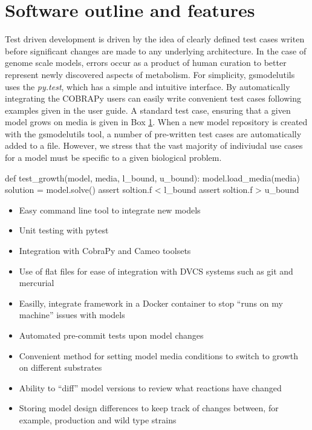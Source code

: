 \documentclass{bioinfo}
\begin{document}

\section{Software outline and features}
Test driven development is driven by the idea of clearly defined test cases writen before significant changes are made to any underlying architecture.
In the case of genome scale models, errors occur as a product of human curation to better represent newly discovered aspects of metabolism.
For simplicity, gsmodelutils uses the \textit{py.test}, which has a simple and intuitive interface.
By automatically integrating the COBRAPy \cite{} users can easily write convenient test cases following examples given in the user guide.
A standard test case, ensuring that a given model grows on media is given in Box \ref{}.
When a new model repository is created with the gsmodelutils tool, a number of pre-written test cases are automatically added to a file.
However, we stress that the vast majority of indiviudal use cases for a model must be specific to a given biological problem.

\begin{verbatim*}
def test_growth(model, media, l_bound, u_bound):
    model.load_media(media)
    solution = model.solve()
    assert soltion.f < l_bound
    assert soltion.f > u_bound
\end{verbatim*}


\begin{itemize}
 \item Easy command line tool to integrate new models
 \item Unit testing with pytest
 \item Integration with CobraPy and Cameo toolsets
 \item Use of flat files for ease of integration with DVCS systems such as git and mercurial
 \item Easilly, integrate framework in a Docker container to stop ``runs on my machine'' issues with models
 \item Automated pre-commit tests upon model changes
 \item Convenient method for setting model media conditions to switch to growth on different substrates
 \item Ability to ``diff'' model versions to review what reactions have changed
 \item Storing model design differences to keep track of changes between, for example, production and wild type strains
\end{itemize}
\end{document}
